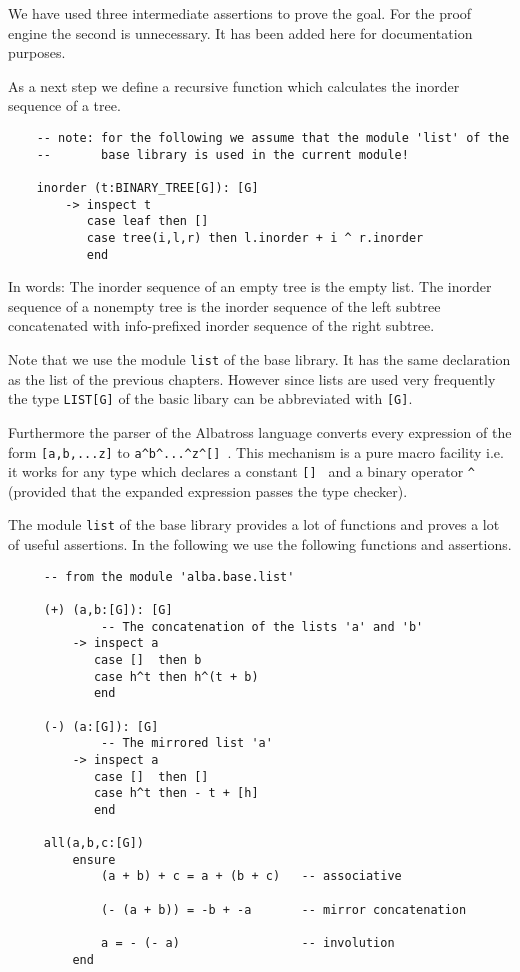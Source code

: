 We have used three intermediate assertions to prove the goal. For the proof
engine the second is unnecessary. It has been added here for documentation
purposes.


As a next step we define a recursive function which calculates the inorder
sequence of a tree.

\begin{lstlisting}
    -- note: for the following we assume that the module 'list' of the
    --       base library is used in the current module!

    inorder (t:BINARY_TREE[G]): [G]
        -> inspect t
           case leaf then [] 
           case tree(i,l,r) then l.inorder + i ^ r.inorder
           end
\end{lstlisting}

In words: The inorder sequence of an empty tree is the empty list. The inorder
sequence of a nonempty tree is the inorder sequence of the left subtree
concatenated with info-prefixed inorder sequence of the right subtree.

Note that we use the module \lstinline!list! of the base library. It has the
same declaration as the list of the previous chapters. However since lists are
used very frequently the type \lstinline!LIST[G]! of the basic libary can be
abbreviated with \lstinline![G]!.

Furthermore the parser of the Albatross language converts every expression of
the form \lstinline![a,b,...z]! to \lstinline!a^b^...^z^[] !. This mechanism
is a pure macro facility i.e. it works for any type which declares a constant
\lstinline![] ! and a binary operator \lstinline!^! (provided that the
expanded expression passes the type checker).

The module \lstinline!list! of the base library provides a lot of functions
and proves a lot of useful assertions. In the following we use the following
functions and assertions.

\begin{lstlisting}
     -- from the module 'alba.base.list'

     (+) (a,b:[G]): [G]
             -- The concatenation of the lists 'a' and 'b'
         -> inspect a
            case []  then b
            case h^t then h^(t + b)
            end

     (-) (a:[G]): [G]
             -- The mirrored list 'a'
         -> inspect a
            case []  then [] 
            case h^t then - t + [h]
            end

     all(a,b,c:[G])
         ensure
             (a + b) + c = a + (b + c)   -- associative
             
             (- (a + b)) = -b + -a       -- mirror concatenation

             a = - (- a)                 -- involution
         end
\end{lstlisting}

